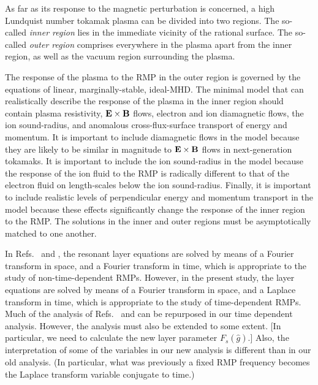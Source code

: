 \documentclass[12pt,prb,aps]{revtex4-1}
\begin{document}
As far as its response to the magnetic perturbation is concerned, a high Lundquist number
tokamak plasma can be divided into two regions.\cite{fkr,hk,wb,err1,err1a,rf1,rf2,err2,com,hz,err3}
 The so-called {\em inner region}\/ lies in the immediate
vicinity of the rational surface. The so-called {\em outer region}\/ comprises everywhere in the plasma apart from the
inner region, as well as the vacuum region surrounding the plasma. 

The response of the plasma to the RMP in the outer region is
governed by the equations of linear, marginally-stable, ideal-MHD.\cite{err1} The minimal model that can
realistically describe the response of the plasma in the inner region  should contain plasma resistivity, ${\bf E}\times {\bf B}$ flows, electron and ion diamagnetic flows, the ion sound-radius, and anomalous cross-flux-surface transport of energy and momentum. It is important to include diamagnetic flows in the model because they are likely to be similar in magnitude to ${\bf E}\times {\bf B}$ flows in next-generation tokamaks.  It is important to include the ion sound-radius in the model because the
response of the ion fluid to the RMP is radically different to that of the electron fluid on length-scales
below the ion sound-radius. Finally, it is important to include realistic levels of perpendicular energy and momentum
transport in the model because these effects significantly  change the response of the inner region to 
the RMP.\cite{err2} The solutions in the inner and outer regions must be asymptotically 
matched to one another.\cite{fkr}

In Refs.~ and , the resonant layer equations are solved by means of a Fourier transform in space, and a Fourier transform in time,
which is appropriate to the study of non-time-dependent RMPs. However, in the present study, the layer equations are solved by means of a Fourier transform in
space, and a Laplace transform in time, which is appropriate to the study of time-dependent RMPs. Much of the analysis of Refs.~ and 
can be repurposed in our time dependent analysis. However, the analysis must also be extended to some extent. [In particular, we need to calculate the
new layer parameter $F_s(\hat{g})$.] Also, the interpretation of some of the variables in our new analysis is different than in our old analysis. (In particular,
what was previously a fixed RMP frequency becomes the Laplace transform variable conjugate to time.)
\end{document}
